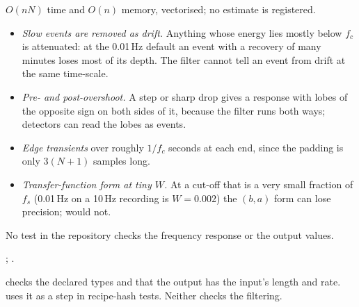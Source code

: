 $O(nN)$ time and $O(n)$ memory, vectorised; no estimate is registered.

\begin{itemize}
\item \emph{Slow events are removed as drift.} Anything whose energy lies mostly below $f_c$
  is attenuated: at the 0.01\,Hz default an event with a recovery of many minutes loses most of
  its depth. The filter cannot tell an event from drift at the same time-scale.
\item \emph{Pre- and post-overshoot.} A step or sharp drop gives a response with lobes of the
  opposite sign on both sides of it, because the filter runs both ways; detectors can read the
  lobes as events.
\item \emph{Edge transients} over roughly $1/f_c$ seconds at each end, since the padding is only
  $3(N+1)$ samples long. 
\item \emph{Transfer-function form at tiny $W$.} At a cut-off that is a very small fraction of
  $f_s$ (0.01\,Hz on a 10\,Hz recording is $W = 0.002$) the $(b, a)$ form can lose precision;
   would not. 
\end{itemize}

No test in the repository checks the frequency response or the output values.

\citet{butterworth1930theory}; \citet{virtanen2020scipy}.

 checks the declared types and that the output has the
input's length and rate.  uses it as a step in recipe-hash tests.
Neither checks the filtering.
